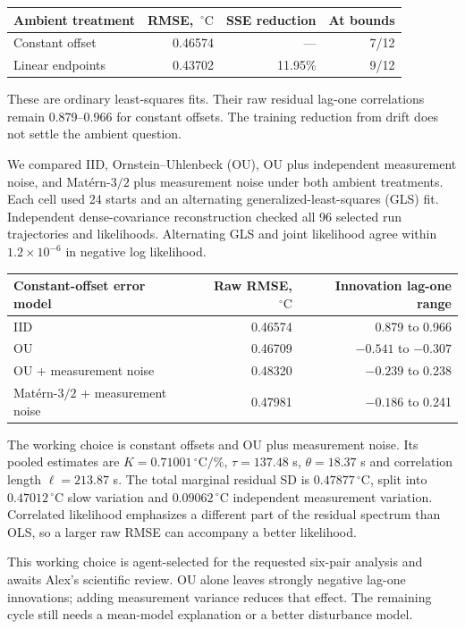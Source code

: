 \documentclass[10pt,letterpaper]{article}
\newcommand{\C}{\,^\circ\mathrm{C}}
\begin{document}
\begin{tabular}{@{}lrrr@{}}
\toprule
Ambient treatment & RMSE, $\C$ & SSE reduction & At bounds\\
\midrule
Constant offset & 0.46574 & --- & 7/12\\
Linear endpoints & 0.43702 & 11.95\% & 9/12\\
\bottomrule
\end{tabular}

These are ordinary least-squares fits. Their raw residual lag-one correlations remain 0.879--0.966 for constant offsets. The training reduction from drift does not settle the ambient question.

We compared IID, Ornstein--Uhlenbeck (OU), OU plus independent measurement noise, and Mat\'ern-$3/2$ plus measurement noise under both ambient treatments. Each cell used 24 starts and an alternating generalized-least-squares (GLS) fit. Independent dense-covariance reconstruction checked all 96 selected run trajectories and likelihoods. Alternating GLS and joint likelihood agree within $1.2\times10^{-6}$ in negative log likelihood.

\begin{tabularx}{\linewidth}{@{}Xrr@{}}
\toprule
Constant-offset error model & Raw RMSE, $\C$ & Innovation lag-one range\\
\midrule
IID & 0.46574 & 0.879 to 0.966\\
OU & 0.46709 & $-0.541$ to $-0.307$\\
OU + measurement noise & 0.48320 & $-0.239$ to 0.238\\
Mat\'ern-$3/2$ + measurement noise & 0.47981 & $-0.186$ to 0.241\\
\bottomrule
\end{tabularx}

The working choice is constant offsets and OU plus measurement noise. Its pooled estimates are $K=0.71001\C/\%$, $\tau=137.48$ s, $\theta=18.37$ s and correlation length $\ell=213.87$ s. The total marginal residual SD is $0.47877\C$, split into $0.47012\C$ slow variation and $0.09062\C$ independent measurement variation. Correlated likelihood emphasizes a different part of the residual spectrum than OLS, so a larger raw RMSE can accompany a better likelihood.

This working choice is agent-selected for the requested six-pair analysis and awaits Alex's scientific review. OU alone leaves strongly negative lag-one innovations; adding measurement variance reduces that effect. The remaining cycle still needs a mean-model explanation or a better disturbance model.
\end{document}
